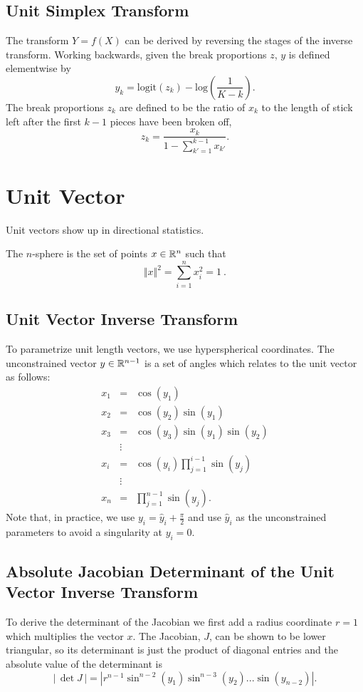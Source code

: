 \subsection{Unit Simplex Transform}

The transform $Y = f(X)$ can be derived by reversing the stages of the
inverse transform.  Working backwards, given the break proportions
$z$, $y$ is defined elementwise by
%
\[
y_k 
= \mbox{logit}(z_k)
- \mbox{log}\left(
   \frac{1}{K-k}
   \right)
.
\]
%
The break proportions $z_k$ are defined to be the ratio of $x_k$ to
the length of stick left after the first $k-1$ pieces have been broken
off, 
%
\[
z_k 
= \frac{x_k}
       {1 - \sum_{k' = 1}^{k-1} x_{k'}}
.
\]

\section{Unit Vector}
Unit vectors show up in directional statistics.

The $n$-sphere is the set of points $x \in \reals^n$ such that 
\[
\Vert x \Vert^2 = \sum_{i=1}^n x_i^2 = 1\ .
\]

\subsection{Unit Vector Inverse Transform}

To parametrize unit length vectors, we use hyperspherical coordinates.
The unconstrained vector $y \in \reals^{n-1}$ is a set of angles which
relates to the unit vector as follows:
\begin{eqnarray*}
x_1 & = & \cos(y_1) \\
x_2 & = & \cos(y_2) \sin(y_1) \\
x_3 & = & \cos(y_3) \sin(y_1) \sin(y_2) \\
& \vdots & \\
x_i & = & \cos(y_i) \prod_{j=1}^{i-1} \sin(y_j) \\
& \vdots & \\
x_n & = & \prod_{j=1}^{n-1} \sin(y_j).
\end{eqnarray*}
Note that, in practice, we use $y_i = \hat{y}_i + \frac{\pi}{2}$ and use $\hat{y}_i$ as the unconstrained parameters to avoid a singularity at
$y_i = 0$.


\subsection{Absolute Jacobian Determinant of the Unit Vector
  Inverse Transform}
To derive the determinant of the Jacobian we first add a radius coordinate
$r=1$ which multiplies the vector $x$.
The Jacobian, $J$, can be shown to be lower triangular, so its
determinant is just the product of diagonal entries and the 
absolute value of the determinant is
\[
\left| \, \det J \, \right| = \left|r^{n-1} \sin^{n-2}(y_1) \sin^{n-3}(y_2) ... \sin(y_{n-2})\right| .
\]


